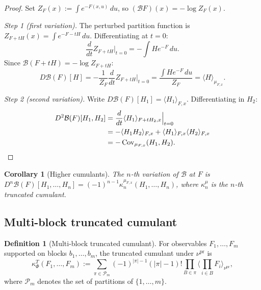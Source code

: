 \documentclass[12pt]{article}
\theoremstyle{plain}
\newtheorem{corollary}[theorem]{Corollary}
\theoremstyle{definition}
\newtheorem{definition}[theorem]{Definition}
\numberwithin{equation}{section}
\newcommand{\Cov}{\operatorname{Cov}}
\newcommand{\pr}{\mathrm{pr}}
\begin{document}
\begin{proof}
Set $Z_F(x):=\int e^{-F(x,u)}\,du$, so $(\mathcal{B}F)(x)=-\log Z_F(x)$.

\emph{Step 1 (first variation).}  The perturbed partition function is $Z_{F+tH}(x)=\int e^{-F-tH}\,du$.  Differentiating at $t=0$:
\begin{equation}
\frac{d}{dt}Z_{F+tH}\Big|_{t=0} = -\int He^{-F}\,du.
\end{equation}
Since $\mathcal{B}(F+tH)=-\log Z_{F+tH}$:
\begin{equation}
D\mathcal{B}(F)[H] = -\frac{1}{Z_F}\frac{d}{dt}Z_{F+tH}\Big|_{t=0} = \frac{\int He^{-F}\,du}{Z_F} = \langle H\rangle_{\mu_{F,x}}.
\end{equation}

\emph{Step 2 (second variation).}  Write $D\mathcal{B}(F)[H_1]=\langle H_1\rangle_{F,x}$.  Differentiating in $H_2$:
\begin{align}
D^2\mathcal{B}(F)[H_1,H_2] &= \frac{d}{dt}\langle H_1\rangle_{F+tH_2,x}\Big|_{t=0}\\
&= -\langle H_1 H_2\rangle_{F,x} + \langle H_1\rangle_{F,x}\langle H_2\rangle_{F,x}\\
&= -\Cov_{\mu_{F,x}}(H_1,H_2).\qedhere
\end{align}
\end{proof}

\begin{corollary}[Higher cumulants]\label{cor:highercumulants}
The $n$-th variation of $\mathcal{B}$ at $F$ is $D^n\mathcal{B}(F)[H_1,\ldots,H_n]=(-1)^{n-1}\kappa_n^{\mu_{F,x}}(H_1,\ldots,H_n)$, where $\kappa_n^\mu$ is the $n$-th truncated cumulant.
\end{corollary}

\subsection{Multi-block truncated cumulant}

\begin{definition}[Multi-block truncated cumulant]
For observables $F_1,\ldots,F_m$ supported on blocks $b_1,\ldots,b_m$, the truncated cumulant under $\nu^{\pr}$ is
\begin{equation}
\kappa_\Phi^T(F_1,\ldots,F_m) := \sum_{\pi\in\mathcal{P}_m}(-1)^{|\pi|-1}(|\pi|-1)!\prod_{B\in\pi}\Big\langle\prod_{i\in B}F_i\Big\rangle_{\nu^{\pr}},
\end{equation}
where $\mathcal{P}_m$ denotes the set of partitions of $\{1,\ldots,m\}$.
\end{definition}
\end{document}
